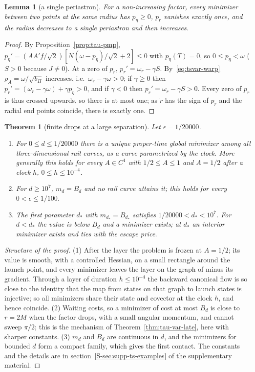 \documentclass[aip,jmp,amsmath,amssymb,reprint]{revtex4-2}
\theoremstyle{plain}
\newtheorem{theorem}{Theorem}
\newtheorem{lemma}[proposition]{Lemma}
\theoremstyle{definition}
\begin{document}
\begin{lemma}[a single periastron]\label{lem:tau-var-peri}
For a non-increasing factor, every minimizer between two points at the same radius has
$p_\eta\ge0$, $p_r$ vanishes exactly once, and the radius decreases to a single periastron and then increases.
\end{lemma}

\begin{proof}
By Proposition~\ref{prop:tau-pmp}, $p_\eta'=(AA'f/\sqrt2)[N(\omega-p_\eta)/\sqrt2+2]\le0$ with $p_\eta(T)=0$, so $0\le p_\eta<\omega$
($S>0$ because $J\neq0$). At a zero of $p_r$, $p_r'=\omega_r-\gamma S$. By~\eqref{eq:tsvar-warp}
$\rho_A=\omega/\sqrt{b_H}$ increases, i.e.\ $\omega_r-\gamma\omega>0$; if $\gamma\ge0$ then
$p_r'=(\omega_r-\gamma\omega)+\gamma p_\eta>0$, and if $\gamma<0$ then $p_r'=\omega_r-\gamma S>0$. Every zero of $p_r$ is thus
crossed upwards, so there is at most one; as $\dot r$ has the sign of $p_r$ and the radial end points
coincide, there is exactly one.
\end{proof}

\begin{theorem}[finite drops at a large separation]\label{thm:tau-var-drop}
Let $\epsilon=1/20000$.
\begin{enumerate}
\item For $0\le d\le1/20000$ there is a unique proper-time global minimizer among all three-dimensional
  rail curves, as a curve parametrized by the clock. More generally this holds for every
  $A\in C^1$ with $1/2\le A\le1$ and $A=1/2$ after a clock $h$, $0\le h\le10^{-4}$.
\item For $d\ge10^7$, $m_d=B_d$ and no rail curve attains it; this holds for every
  $0<\epsilon\le1/100$.
\item The first parameter $d_*$ with $m_{d_*}=B_{d_*}$ satisfies $1/20000<d_*<10^7$. For $d<d_*$ the value is
  below $B_d$ and a minimizer exists; at $d_*$ an interior minimizer exists and ties with the escape price.
\end{enumerate}
\end{theorem}

\begin{proof}[Structure of the proof]
(1) After the layer the problem is frozen at $A=1/2$; its value is smooth, with a controlled Hessian, on a small
rectangle around the launch point, and every minimizer leaves the layer on the graph of minus its gradient. Through
a layer of duration $h\le10^{-4}$ the backward canonical flow is so close to the identity that the map from
states on that graph to launch states is injective; so all minimizers share their state and covector at the
clock $h$, and hence coincide. (2) Waiting costs, so a minimizer of cost at most $B_d$ is close to $r=2M$ when the
factor drops, with a small angular momentum, and cannot sweep $\pi/2$; this is the mechanism of
Theorem~\ref{thm:tau-var-late}, here with sharper constants. (3) $m_d$ and $B_d$ are continuous in $d$, and the
minimizers for bounded $d$ form a compact family, which gives the first contact. The constants and the
details are in section~\ref{S-sec:supp-ts-examples} of the supplementary material.
\end{proof}
\end{document}
